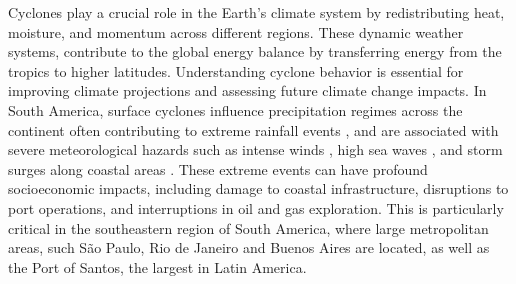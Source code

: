\documentclass[pdflatex,sn-chicago]{sn-jnl}%
\theoremstyle{plain}
\theoremstyle{definition}
\theoremstyle{remark}
\theoremstyle{definition}
\begin{document}

Cyclones play a crucial role in the Earth's climate system by redistributing heat, moisture, and momentum across different regions. These dynamic weather systems, contribute to the global energy balance by transferring energy from the tropics to higher latitudes. Understanding cyclone behavior is essential for improving climate projections and assessing future climate change impacts. In South America, surface cyclones influence precipitation regimes across the continent \citep{reboita2010precipitation, reboita2018extratropical, de2022hybrid} often contributing to extreme rainfall events \citep[e.g.,][]{de2021ocean,de2024extreme}, and are associated with severe meteorological hazards such as intense winds \citep{cardoso2022synoptic,de2021ocean}, high sea waves \citep{da2025classification,gramcianinov2023impact}, and storm surges along coastal areas \citep{leal2023identification,tecchiomean}. These extreme events can have profound socioeconomic impacts, including damage to coastal infrastructure, disruptions to port operations, and interruptions in oil and gas exploration. This is particularly critical in the southeastern region of South America, where large metropolitan areas, such São Paulo, Rio de Janeiro and Buenos Aires are located, as well as the Port of Santos, the largest in Latin America. 
\end{document}
